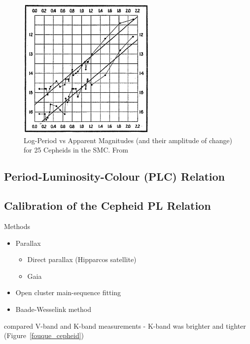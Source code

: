 \documentclass{spy}
\begin{document}
\begin{figure}[ht]
    \centering
    \includegraphics[width=0.6\textwidth]{leavitt_period_luminosity.eps}
    \caption{Log-Period vs Apparent Magnitudes (and their amplitude of change) for 25 Cepheids in the SMC. From \citet{leavittPeriods25Variable1912}}    \label{leavitt_period_luminosity_diagram}
\end{figure}

\subsection{Period-Luminosity-Colour (PLC) Relation}

\subsection{Calibration of the Cepheid PL Relation}
Methods
\begin{itemize}
    \item Parallax
        \begin{itemize}
        \item Direct parallax (Hipparcos satellite)
        \item Gaia
        \end{itemize}
    \item Open cluster main-sequence fitting
    \item Baade-Wesselink method
\end{itemize}

\citet{fouqueNewCalibrationGalactic2007} compared V-band and K-band measurements - K-band was brighter and tighter (Figure~\ref{fouque_cepheid})
\end{document}
